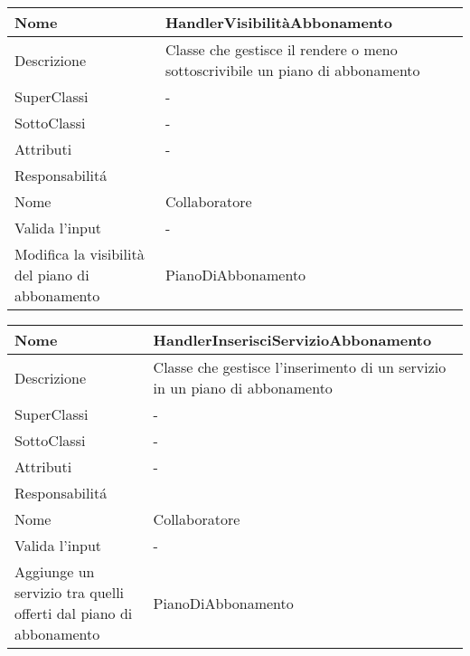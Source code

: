 \begin{center}
    \begin{longtable}{ |p{3cm}|p{3cm}|p{3cm}|p{3cm}| }
        \hline
        Nome & \multicolumn{3}{|p{9cm}|}{HandlerVisibilitàAbbonamento} \\\hline
        Descrizione & \multicolumn{3}{|p{9cm}|}{Classe che gestisce il rendere o meno sottoscrivibile un piano di abbonamento} \\\hline
        SuperClassi & \multicolumn{3}{|p{9cm}|}{-} \\\hline
        SottoClassi & \multicolumn{3}{|p{9cm}|}{-} \\\hline
        Attributi & \multicolumn{3}{|p{9cm}|}{-} \\\hline
        \multicolumn{4}{|p{12cm}|}{Responsabilit\'a} \\\hline
        \multicolumn{2}{|p{6cm}|}{Nome} & \multicolumn{2}{|p{6cm}|}{Collaboratore} \\\hline
        \multicolumn{2}{|p{6cm}|}{Valida l'input} & \multicolumn{2}{|p{6cm}|}{-} \\\hline
        \multicolumn{2}{|p{6cm}|}{Modifica la visibilità del piano di abbonamento} & \multicolumn{2}{|p{6cm}|}{PianoDiAbbonamento} \\\hline
    \end{longtable}
\end{center}

\begin{center}
    \begin{longtable}{ |p{3cm}|p{3cm}|p{3cm}|p{3cm}| }
        \hline
        Nome & \multicolumn{3}{|p{9cm}|}{HandlerInserisciServizioAbbonamento} \\\hline
        Descrizione & \multicolumn{3}{|p{9cm}|}{Classe che gestisce l'inserimento di un servizio in un piano di abbonamento} \\\hline
        SuperClassi & \multicolumn{3}{|p{9cm}|}{-} \\\hline
        SottoClassi & \multicolumn{3}{|p{9cm}|}{-} \\\hline
        Attributi & \multicolumn{3}{|p{9cm}|}{-} \\\hline
        \multicolumn{4}{|p{12cm}|}{Responsabilit\'a} \\\hline
        \multicolumn{2}{|p{6cm}|}{Nome} & \multicolumn{2}{|p{6cm}|}{Collaboratore} \\\hline
        \multicolumn{2}{|p{6cm}|}{Valida l'input} & \multicolumn{2}{|p{6cm}|}{-} \\\hline
        \multicolumn{2}{|p{6cm}|}{Aggiunge un servizio tra quelli offerti dal piano di abbonamento} & \multicolumn{2}{|p{6cm}|}{PianoDiAbbonamento} \\\hline
    \end{longtable}
\end{center}

